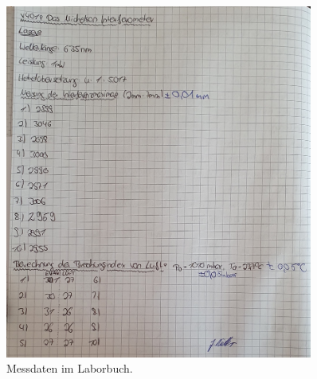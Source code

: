 \begin{figure}
    \centering
    \includegraphics[width=0.9\textwidth]{content/Laborbuch.jpg}
    \caption{Messdaten im Laborbuch.}
\end{figure}


%
